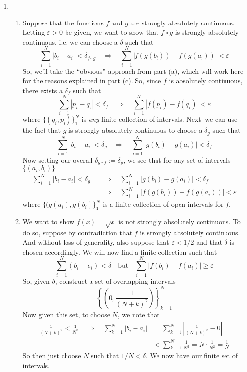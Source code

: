 \documentclass[12pt]{article}
\theoremstyle{plain}
\theoremstyle{definition}
\theoremstyle{remark}
\begin{document}
\begin{enumerate}
\begin{enumerate}
\item 
\begin{enumerate} 

\item Suppose that the functions $f$ and $g$ are strongly absolutely continuous. Letting $\varepsilon>0$ be given, we want to show that $f\circ g$ is strongly absolutely continuous, i.e. we can choose a $\delta$ such that 
\begin{equation}
    \sum_{i=1}^N |b_i-a_i|<\delta_{f\circ g}
    \quad\Rightarrow\quad
    \sum_{i=1}^N |f(g(b_i))-f(g(a_i))|<\varepsilon
\end{equation}
So, we'll take the ``obvious'' approach from part (a), which will work here for the reasons explained in part (c). So, since $f$ is absolutely continuous, there exists a $\delta_f$ such that
\begin{equation}
    \sum_{i=1}^N |p_i-q_i|<\delta_f
    \quad\Rightarrow\quad
    \sum_{i=1}^N |f(p_i)-f(q_i)|<\varepsilon
\end{equation}
where $\{(q_i,p_i)\}_1^N$ is \emph{any} finite collection of intervals. Next, we can use the fact that $g$ is strongly absolutely continuous to choose a $\delta_g$ such that
\begin{equation}
    \sum_{i=1}^N |b_i-a_i|<\delta_g
    \quad\Rightarrow\quad
    \sum_{i=1}^N |g(b_i)-g(a_i)|<\delta_f
\end{equation}
Now setting our overall $\delta_{g\circ f}:=\delta_g$, we see that for any set of intervals $\{(a_i, b_i)\}$
\begin{align*}
    \sum_{i=1}^N |b_i-a_i|<\delta_g
    &\quad\Rightarrow\quad
    \sum_{i=1}^N |g(b_i)-g(a_i)|<\delta_f \\
    &\quad\Rightarrow\quad
    \sum_{i=1}^N |f(g(b_i))-f(g(a_i))|<\varepsilon
\end{align*}
where $\{(g(a_i),g(b_i)\}^N_1$ is a finite collection of open intervals for $f$.

\item We want to show $f(x)=\sqrt{x}$ is not strongly absolutely continuous. To do so, suppose by contradiction that $f$ is strongly absolutely continuous. And without loss of generality, also suppose that $\varepsilon<1/2$ and that $\delta$ is chosen accordingly. We will now find a finite collection such that
\[
    \sum_{i=1}^N (b_i-a_i) < \delta
    \quad\text{but}\quad
    \sum_{i=1}^N |f(b_i)-f(a_i)| \geq \varepsilon 
\]
So, given $\delta$, construct a set of overlapping intervals 
\[
    \left\{\left(0,\frac{1}{(N+k)^2}\right)\right\}^N_{k=1}
\]
Now given this set, to choose $N$, we note that
\begin{align*}
    \frac{1}{(N+k)^2} <  \frac{1}{N^2}  
    \quad\Rightarrow\quad
    \sum_{k=1}^N |b_i-a_i| &=
    \sum_{k=1}^N \left\lvert\frac{1}{(N+k)^2}-0\right\rvert \\
    &<\sum_{k=1}^N \frac{1}{N^2}
     =N\cdot \frac{1}{N^2} = \frac{1}{N}
\end{align*}
So then just choose $N$ such that $1/N < \delta$. We now have our finite set of intervals. 


\end{enumerate}
\end{enumerate}
\end{enumerate}
\end{document}
